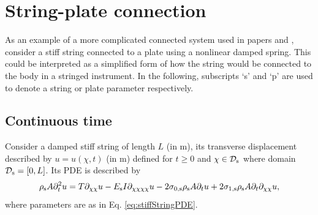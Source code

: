 
\section{String-plate connection}\label{sec:stringPlateConnection}
As an example of a more complicated connected system used in papers \citeP[A] and \citeP[B], consider a stiff string connected to a plate using a nonlinear damped spring. This could be interpreted as a simplified form of how the string would be connected to the body in a stringed instrument. In the following, subscripts `s' and `p' are used to denote a string or plate parameter respectively. 

\subsection{Continuous time}
Consider a damped stiff string of length $L$ (in m), its transverse displacement described by $u = u(\chi,t)$ (in m) defined for $t\geq 0$ and $\chi \in \mathcal{D}_{\text{s}}$ where domain $\mathcal{D}_{\text{s}} = [0, L]$. Its PDE is described by
\begin{equation}
    \rho_\stxt A\ptt u = T \partial_{\chi\chi} u - E_\stxt I \partial_{\chi\chi\chi\chi} u - 2\szX[\stxt]\rho_\stxt A\pt u + 2\soX[\stxt]\rho_\stxt A\pt\partial_{\chi\chi} u,
\end{equation}
where parameters are as in Eq. \eqref{eq:stiffStringPDE}.

